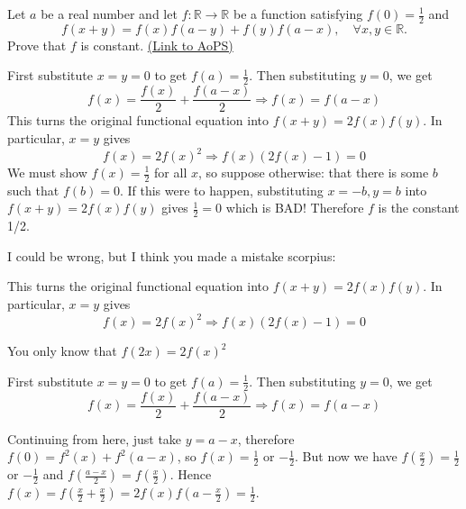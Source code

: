 \begin{problem}
	Let $a$ be a real number and let $f : \mathbb{R}\rightarrow \mathbb{R}$ be a function satisfying $f(0)=\frac{1}{2}$ and 
\[f(x+y)=f(x)f(a-y)+f(y)f(a-x), \quad \forall x,y \in \mathbb{R}.\]
Prove that $f$ is constant.
	\flushright \href{https://artofproblemsolving.com/community/c6h145359}{(Link to AoPS)}
\end{problem}



\begin{mysolution}
	
First substitute $x=y=0$ to get $f(a)=\frac{1}{2}$. Then substituting $y=0$, we get
\[f(x)=\frac{f(x)}{2}+\frac{f(a-x)}{2}\Rightarrow f(x)=f(a-x)\]
This turns the original functional equation into $f(x+y)=2f(x)f(y)$. In particular, $x=y$ gives
\[f(x)=2f(x)^{2}\Rightarrow f(x)(2f(x)-1)=0\]
We must show $f(x)=\frac{1}{2}$ for all $x$, so suppose otherwise: that there is some $b$ such that $f(b)=0$. If this were to happen, substituting $x=-b,y=b$ into $f(x+y)=2f(x)f(y)$ gives $\frac{1}{2}=0$ which is BAD! Therefore $f$ is the constant 1/2.

\end{mysolution}



\begin{mysolution}
	I could be wrong, but I think you made a mistake scorpius:

\begin{tcolorbox}
This turns the original functional equation into $f(x+y)=2f(x)f(y)$. In particular, $x=y$ gives
\[f(x)=2f(x)^{2}\Rightarrow f(x)(2f(x)-1)=0 \]
\end{tcolorbox}

You only know that $f(2x)=2f(x)^{2}$
\end{mysolution}



\begin{mysolution}
	\begin{tcolorbox}
First substitute $x=y=0$ to get $f(a)=\frac{1}{2}$. Then substituting $y=0$, we get
\[f(x)=\frac{f(x)}{2}+\frac{f(a-x)}{2}\Rightarrow f(x)=f(a-x) \]
\end{tcolorbox}

Continuing from here, just take $y = a-x$, therefore $f(0) = f^{2}(x)+f^{2}(a-x)$, so $f(x) = \frac{1}{2}$ or $-\frac{1}{2}$.
But now we have $f(\frac{x}{2}) = \frac{1}{2}$ or $-\frac{1}{2}$ and $f(\frac{a-x}{2}) = f(\frac{x}{2})$. Hence $f(x) = f(\frac{x}{2 }+\frac{x}{2}) = 2 f(x) f(a-\frac{x}{2}) =\frac{1}{2}$.
\end{mysolution}



